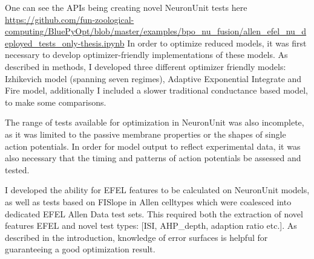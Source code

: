 One can see the APIs being creating novel NeuronUnit tests here \url{https://github.com/fun-zoological-computing/BluePyOpt/blob/master/examples/bpo_nu_fusion/allen_efel_nu_deployed_tests_only-thesis.ipynb}
In order to optimize reduced models, it was first necessary to develop optimizer-friendly implementations of these models. As described in methods, I developed three different optimizer friendly models: Izhikevich model (spanning seven regimes), Adaptive Exponential Integrate and Fire model, additionally I included a slower traditional conductance based model, to make some comparisons.

The range of tests available for optimization in NeuronUnit was also incomplete, as it was limited to the passive membrane properties or the shapes of single action potentials.  In order for model output to reflect experimental data, it was also necessary that the timing and patterns of action potentials be assessed and tested. 

I developed the ability for EFEL features to be calculated on NeuronUnit models, as well as tests based on FISlope in Allen celltypes which were coalesced into dedicated EFEL Allen Data test sets. This required both the extraction of novel features EFEL and novel test types: [ISI, AHP\_depth, adaption ratio etc.]. As described in the introduction, knowledge of error surfaces is helpful for guaranteeing a good optimization result. 


